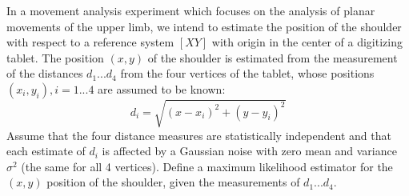 \Exercise[number={2}]
In a movement analysis experiment which focuses on the analysis of
planar movements of the upper limb, we intend to estimate the position
of the shoulder with respect to a reference system \([XY]\) with origin
in the center of a digitizing tablet.
The position \((x,y)\) of the shoulder is estimated from the
measurement of the distances \(d_1...d_4\) from the four vertices of
the tablet, whose positions \((x_i,y_i), i=1...4\) are assumed to be
known:
\[
    d_i = \sqrt{(x-x_i)^2+(y-y_i)^2}
\]
Assume that the four distance measures are statistically independent
and that each estimate of \(d_i\) is affected by a Gaussian noise
with zero mean and variance \(\sigma^2\) (the same for all 4 vertices). Define a maximum likelihood 
estimator for the \((x,y)\) position of the shoulder, given the measurements of \(d_1...d_4\).

